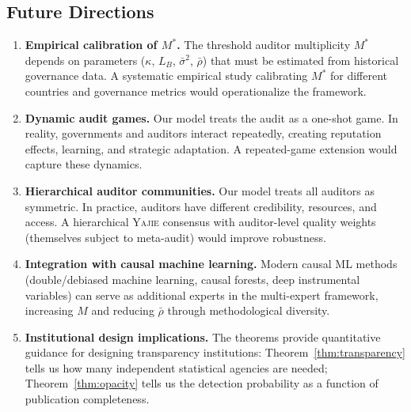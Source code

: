 \documentclass[11pt,a4paper]{article}
\theoremstyle{definition}
\newcommand{\Yajie}{\textsc{Yajie}}
\begin{document}
\subsection{Future Directions}
\begin{enumerate}[label=(\roman*)]
    \item \textbf{Empirical calibration of $M^*$.} The threshold auditor multiplicity $M^*$ depends on parameters ($\kappa$, $L_B$, $\bar{\sigma}^2$, $\bar{\rho}$) that must be estimated from historical governance data. A systematic empirical study calibrating $M^*$ for different countries and governance metrics would operationalize the framework.
    \item \textbf{Dynamic audit games.} Our model treats the audit as a one-shot game. In reality, governments and auditors interact repeatedly, creating reputation effects, learning, and strategic adaptation. A repeated-game extension would capture these dynamics.
    \item \textbf{Hierarchical auditor communities.} Our model treats all auditors as symmetric. In practice, auditors have different credibility, resources, and access. A hierarchical \Yajie{} consensus with auditor-level quality weights (themselves subject to meta-audit) would improve robustness.
    \item \textbf{Integration with causal machine learning.} Modern causal ML methods (double/debiased machine learning, causal forests, deep instrumental variables) can serve as additional experts in the multi-expert framework, increasing $M$ and reducing $\bar{\rho}$ through methodological diversity.
    \item \textbf{Institutional design implications.} The theorems provide quantitative guidance for designing transparency institutions: Theorem~\ref{thm:transparency} tells us how many independent statistical agencies are needed; Theorem~\ref{thm:opacity} tells us the detection probability as a function of publication completeness.
\end{enumerate}
\end{document}
